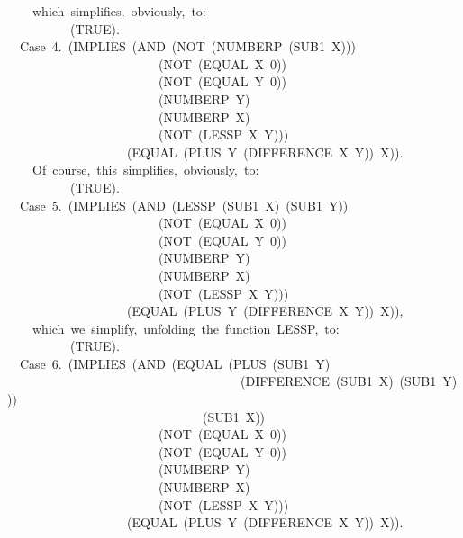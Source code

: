 \documentclass[11pt]{book}
\newenvironment{pubasis}{\begin{flushleft}\ttfamily\small}{\normalsize\rmfamily\end{flushleft}}
\begin{document}
\begin{pubasis}
~~~~which~simplifies,~obviously,~to:\\

~~~~~~~~~~(TRUE).\\

~~Case~4.~(IMPLIES~(AND~(NOT~(NUMBERP~(SUB1~X)))\\
~~~~~~~~~~~~~~~~~~~~~~~~(NOT~(EQUAL~X~0))\\
~~~~~~~~~~~~~~~~~~~~~~~~(NOT~(EQUAL~Y~0))\\
~~~~~~~~~~~~~~~~~~~~~~~~(NUMBERP~Y)\\
~~~~~~~~~~~~~~~~~~~~~~~~(NUMBERP~X)\\
~~~~~~~~~~~~~~~~~~~~~~~~(NOT~(LESSP~X~Y)))\\
~~~~~~~~~~~~~~~~~~~(EQUAL~(PLUS~Y~(DIFFERENCE~X~Y))~X)).\\

~~~~Of~course,~this~simplifies,~obviously,~to:\\

~~~~~~~~~~(TRUE).\\

~~Case~5.~(IMPLIES~(AND~(LESSP~(SUB1~X)~(SUB1~Y))\\
~~~~~~~~~~~~~~~~~~~~~~~~(NOT~(EQUAL~X~0))\\
~~~~~~~~~~~~~~~~~~~~~~~~(NOT~(EQUAL~Y~0))\\
~~~~~~~~~~~~~~~~~~~~~~~~(NUMBERP~Y)\\
~~~~~~~~~~~~~~~~~~~~~~~~(NUMBERP~X)\\
~~~~~~~~~~~~~~~~~~~~~~~~(NOT~(LESSP~X~Y)))\\
~~~~~~~~~~~~~~~~~~~(EQUAL~(PLUS~Y~(DIFFERENCE~X~Y))~X)),\\

~~~~which~we~simplify,~unfolding~the~function~LESSP,~to:\\

~~~~~~~~~~(TRUE).\\

~~Case~6.~(IMPLIES~(AND~(EQUAL~(PLUS~(SUB1~Y)\\
~~~~~~~~~~~~~~~~~~~~~~~~~~~~~~~~~~~~~(DIFFERENCE~(SUB1~X)~(SUB1~Y)))\\
~~~~~~~~~~~~~~~~~~~~~~~~~~~~~~~(SUB1~X))\\
~~~~~~~~~~~~~~~~~~~~~~~~(NOT~(EQUAL~X~0))\\
~~~~~~~~~~~~~~~~~~~~~~~~(NOT~(EQUAL~Y~0))\\
~~~~~~~~~~~~~~~~~~~~~~~~(NUMBERP~Y)\\
~~~~~~~~~~~~~~~~~~~~~~~~(NUMBERP~X)\\
~~~~~~~~~~~~~~~~~~~~~~~~(NOT~(LESSP~X~Y)))\\
~~~~~~~~~~~~~~~~~~~(EQUAL~(PLUS~Y~(DIFFERENCE~X~Y))~X)).\\


\end{pubasis}
\end{document}
